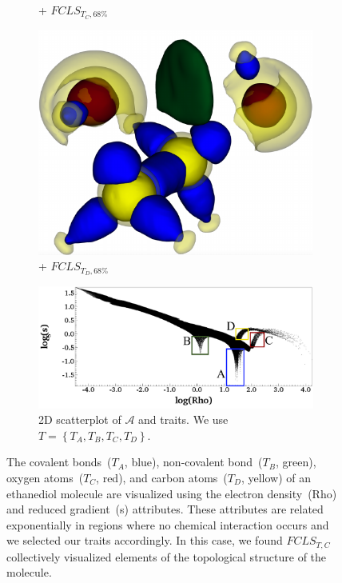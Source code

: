 \begin{figure}[!h]
\begin{subfigure}{0.16\linewidth}
\caption{+ $FCLS_{T_{C},68\%}$}
\label{fig:ethanediol_fcls_oa}
\end{subfigure}
\begin{subfigure}{0.16\linewidth}
\centering
\includegraphics[width=\linewidth]{Images/EthaneDiol/fcls_ca_68.pdf}
\caption{+ $FCLS_{T_{D},68\%}$}
\label{fig:ethanediol_fcls_ca}
\end{subfigure}
\begin{subfigure}{0.18\linewidth}
\centering
\includegraphics[width=\linewidth]{Images/EthaneDiol/scatterplot.pdf}
\caption{2D scatterplot of $\mathcal{A}$ and traits. We use $T = \left\{T_{A}, T_{B}, T_{C}, T_{D}\right\}$.} 
\label{fig:ethanediol_scatterplot}
\end{subfigure}
\caption{The covalent bonds~($T_{A}$, blue), non-covalent bond~($T_{B}$, green), oxygen atoms~($T_{C}$, red), and carbon atoms~($T_{D}$, yellow) of an ethanediol molecule are visualized using the electron density~(Rho) and reduced gradient~(s) attributes. These attributes are related exponentially in regions where no chemical interaction occurs and we selected our traits accordingly. In this case, we found $FCLS_{T,C}$ collectively visualized elements of the topological structure of the molecule.}
\label{fig:ethanediol}
\end{figure}
